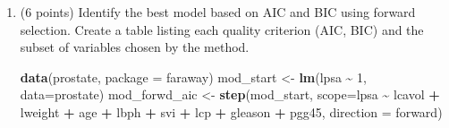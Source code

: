 \documentclass[
]{article}
\newenvironment{Shaded}{\begin{snugshade}}{\end{snugshade}}
\newcommand{\AttributeTok}[1]{\textcolor[rgb]{0.13,0.29,0.53}{#1}}
\newcommand{\DecValTok}[1]{\textcolor[rgb]{0.00,0.00,0.81}{#1}}
\newcommand{\FunctionTok}[1]{\textcolor[rgb]{0.13,0.29,0.53}{\textbf{#1}}}
\newcommand{\NormalTok}[1]{#1}
\newcommand{\OtherTok}[1]{\textcolor[rgb]{0.56,0.35,0.01}{#1}}
\newcommand{\SpecialCharTok}[1]{\textcolor[rgb]{0.81,0.36,0.00}{\textbf{#1}}}
\newcommand{\StringTok}[1]{\textcolor[rgb]{0.31,0.60,0.02}{#1}}
\begin{document}
\begin{enumerate}
\def\labelenumi{\arabic{enumi}.}
\item
  (6 points) Identify the best model based on AIC and BIC using forward
  selection. Create a table listing each quality criterion (AIC, BIC)
  and the subset of variables chosen by the method.

\begin{Shaded}
\begin{Highlighting}[]
\FunctionTok{data}\NormalTok{(prostate, }\AttributeTok{package =} \StringTok{\textquotesingle{}faraway\textquotesingle{}}\NormalTok{)}
\NormalTok{mod\_start }\OtherTok{\textless{}{-}} \FunctionTok{lm}\NormalTok{(lpsa }\SpecialCharTok{\textasciitilde{}} \DecValTok{1}\NormalTok{, }\AttributeTok{data=}\NormalTok{prostate)}
\NormalTok{mod\_forwd\_aic }\OtherTok{\textless{}{-}} \FunctionTok{step}\NormalTok{(mod\_start, }\AttributeTok{scope=}\NormalTok{lpsa }\SpecialCharTok{\textasciitilde{}}\NormalTok{ lcavol }\SpecialCharTok{+}\NormalTok{ lweight }\SpecialCharTok{+}\NormalTok{ age }\SpecialCharTok{+}\NormalTok{ lbph }\SpecialCharTok{+}\NormalTok{ svi }\SpecialCharTok{+}\NormalTok{ lcp }\SpecialCharTok{+}\NormalTok{ gleason }\SpecialCharTok{+}\NormalTok{ pgg45, }\AttributeTok{direction =} \StringTok{\textquotesingle{}forward\textquotesingle{}}\NormalTok{)}
\end{Highlighting}
\end{Shaded}


\end{enumerate}
\end{document}
